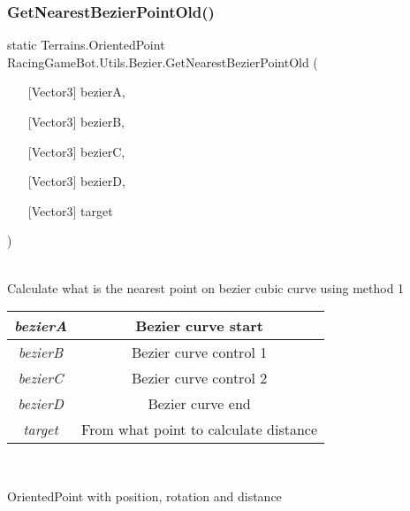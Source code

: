 \subsubsection{\texorpdfstring{GetNearestBezierPointOld()}{GetNearestBezierPointOld()}}
{\footnotesize\ttfamily static Terrains.OrientedPoint RacingGameBot.Utils.Bezier.GetNearestBezierPointOld (\begin{itemize}
    \item[] [{Vector3}]{ bezierA, }
    \item[] [{Vector3}]{ bezierB, }
    \item[] [{Vector3}]{ bezierC, }
    \item[] [{Vector3}]{ bezierD, }
    \item[] [{Vector3}]{ target }
\end{itemize}\hspace{0.5cm})}\\
Calculate what is the nearest point on bezier cubic curve using method 1 \\
\begin{tabular}{|c|c|}
\hline
{\em bezierA} & Bezier curve start\\
\hline
{\em bezierB} & Bezier curve control 1\\
\hline
{\em bezierC} & Bezier curve control 2\\
\hline
{\em bezierD} & Bezier curve end\\
\hline
{\em target} & From what point to calculate distance\\
\hline
\end{tabular}
\\ \begin{Return}
OrientedPoint with position, rotation and distance
\end{Return}
